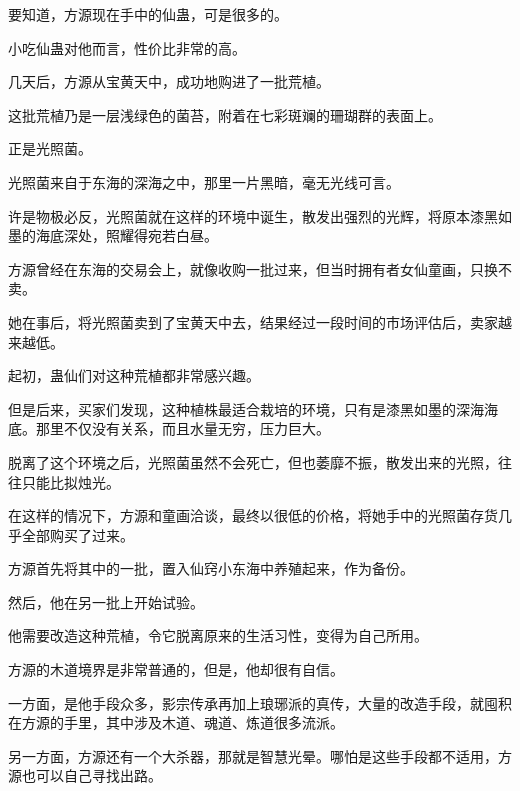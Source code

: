 \begin{this_body}
要知道，方源现在手中的仙蛊，可是很多的。

小吃仙蛊对他而言，性价比非常的高。

几天后，方源从宝黄天中，成功地购进了一批荒植。

这批荒植乃是一层浅绿色的菌苔，附着在七彩斑斓的珊瑚群的表面上。

正是光照菌。

光照菌来自于东海的深海之中，那里一片黑暗，毫无光线可言。

许是物极必反，光照菌就在这样的环境中诞生，散发出强烈的光辉，将原本漆黑如墨的海底深处，照耀得宛若白昼。

方源曾经在东海的交易会上，就像收购一批过来，但当时拥有者女仙童画，只换不卖。

她在事后，将光照菌卖到了宝黄天中去，结果经过一段时间的市场评估后，卖家越来越低。

起初，蛊仙们对这种荒植都非常感兴趣。

但是后来，买家们发现，这种植株最适合栽培的环境，只有是漆黑如墨的深海海底。那里不仅没有关系，而且水量无穷，压力巨大。

脱离了这个环境之后，光照菌虽然不会死亡，但也萎靡不振，散发出来的光照，往往只能比拟烛光。

在这样的情况下，方源和童画洽谈，最终以很低的价格，将她手中的光照菌存货几乎全部购买了过来。

方源首先将其中的一批，置入仙窍小东海中养殖起来，作为备份。

然后，他在另一批上开始试验。

他需要改造这种荒植，令它脱离原来的生活习性，变得为自己所用。

方源的木道境界是非常普通的，但是，他却很有自信。

一方面，是他手段众多，影宗传承再加上琅琊派的真传，大量的改造手段，就囤积在方源的手里，其中涉及木道、魂道、炼道很多流派。

另一方面，方源还有一个大杀器，那就是智慧光晕。哪怕是这些手段都不适用，方源也可以自己寻找出路。

\end{this_body}


